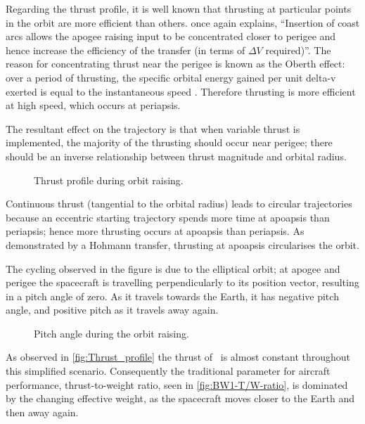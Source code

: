 Regarding the thrust profile, it is well known that thrusting at particular points in the orbit are more efficient than others. \textcite{Kemble2006} once again explains, \enquote{Insertion of coast arcs allows the apogee raising input to be concentrated closer to perigee and hence increase the efficiency of the transfer (in terms of $\Delta V$ required)}. The reason for concentrating thrust near the perigee is known as the Oberth effect: over a period of thrusting, the specific orbital energy gained per unit delta-v exerted is equal to the instantaneous speed \parencite{Oberth1923}. Therefore thrusting is more efficient at high speed, which occurs at periapsis.
 
The resultant effect on the trajectory is that when variable thrust is implemented, the majority of the thrusting should occur near perigee; there should be an inverse relationship between thrust magnitude and orbital radius. 

\begin{figure}
\centering
%
\caption{Thrust profile during orbit raising.}
\label{fig:Thrust_profile}
\end{figure}

Continuous thrust (tangential to the orbital radius) leads to circular trajectories because an eccentric starting trajectory spends more time at apoapsis than periapsis; hence more thrusting occurs at apoapsis than periapsis. As demonstrated by a Hohmann transfer, thrusting at apoapsis circularises the orbit.

The cycling observed in the figure is due to the elliptical orbit; at apogee and perigee the spacecraft is travelling perpendicularly to its position vector, resulting in a pitch angle of zero. As it travels towards the Earth, it has negative pitch angle, and positive pitch as it travels away again.
 
\begin{figure}
\centering
%
\caption{Pitch angle during the orbit raising.}
\label{fig:BW1-Pitch}
\end{figure}

As observed in \autoref{fig:Thrust_profile} the thrust of \BW\ is almost constant throughout this simplified scenario. Consequently the traditional parameter for aircraft performance, thrust-to-weight ratio, seen in \autoref{fig:BW1-T/W-ratio}, is dominated by the changing effective weight, as the spacecraft moves closer to the Earth and then away again.

